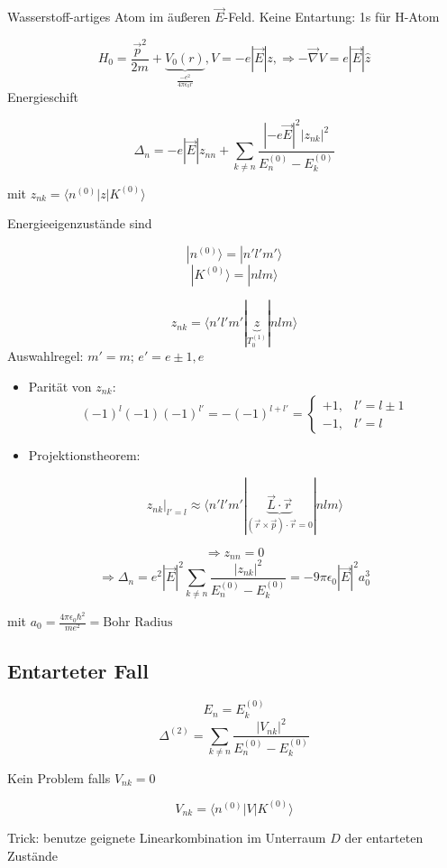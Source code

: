 Wasserstoff-artiges Atom im äußeren \(\vec E\)-Feld. Keine Entartung: 1s für H-Atom

\[ H_0 = \frac{\vec p^2}{2m} +\underbrace{V_0(r)}_{\frac{-e^2}{4\pi
    \epsilon_0 r}}, V = -e|\vec E|z, \Rightarrow -\vec \nabla V = e|\vec E|\hat z \] Energieschift

\[ \Delta_n = -e|\vec E| z_{nn} + \sum_{k\neq
  n} \frac{|-e\vec E|^2|z_{nk}|^2}{E^{(0)}_n-E^{(0)}_k}\]

mit \(z_{nk}=\langle n^{(0)} | z | K^{(0)} \rangle\)

Energieeigenzustände sind

\[ |n^{(0)}\rangle = |n'l'm'\rangle\]
\[ |K^{(0)}\rangle = |nlm\rangle\]

\[ z_{nk} = \langle n'l'm'|\underbrace{z}_{T^{(1)}_0}| nlm\rangle\]
Auswahlregel: \(m'=m\); \(e' = e\pm 1,e\)

\begin{itemize}
\item Parität von \(z_{nk}\):
\[(-1)^l(-1)(-1)^{l'}=-(-1)^{l+l'}= \begin{cases}
  +1,  & l'=l\pm1 \\
  -1, & l'=l
\end{cases}\]
\item Projektionstheorem:

\[ \left. z_{nk}\right |_{l'=l}\approx \langle n'l'm'|\underbrace{\vec L \cdot
  \vec r}_{(\vec r \times \vec p)\cdot \vec r = 0}| nlm\rangle\]


\end{itemize}


\[ \Rightarrow z_{nn} = 0\]
\[\Rightarrow \Delta_n = e^2|\vec E|^2 \sum_{k\neq
  n} \frac{|z_{nk}|^2}{E^{(0)}_n-E^{(0)}_k} = -9\pi \epsilon_0 |\vec E|^2 a^3_0 \]

mit \(a_0 = \frac{4\pi \epsilon_0 \hbar^2}{me^2}=\text{Bohr Radius}\)
 

\subsection{Entarteter Fall}

\[ E_n= E^{(0)}_k \]
\[\Delta^{(2)} =  \sum_{k\neq
  n} \frac{|V_{nk}|^2}{E^{(0)}_n-E^{(0)}_k}\]

Kein Problem falls \(V_{nk} = 0\)

\[ V_{nk} = \langle n^{(0)} | V | K^{(0)} \rangle \]

Trick: benutze geignete Linearkombination im Unterraum \(D\) der entarteten Zustände


